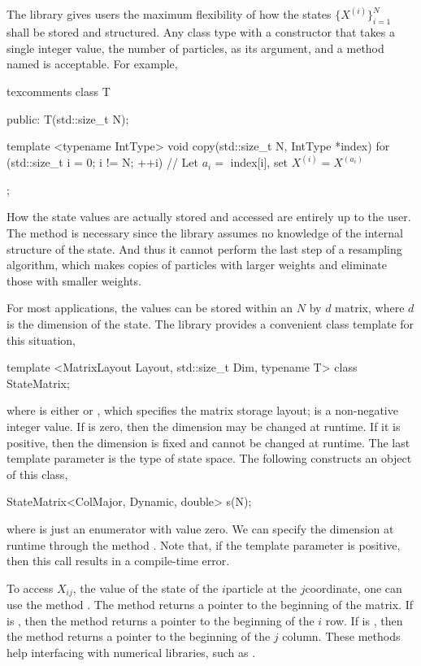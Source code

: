 The library gives users the maximum flexibility of how the states
$\{X^{(i)}\}_{i=1}^N$ shall be stored and structured. Any class type with a
constructor that takes a single integer value, the number of particles, as its
argument, and a method named  is acceptable. For example,
\begin{cppcode*}{texcomments}
  class T
  {
      public:
      T(std::size_t N);

      template <typename IntType>
      void copy(std::size_t N, IntType *index)
      {
          for (std::size_t i = 0; i != N; ++i) {
              // Let $a_i =$ index[i], set $X^{(i)} = X^{(a_i)}$
          }
      }
  };
\end{cppcode*}
How the state values are actually stored and accessed are entirely up to the
user. The method  is necessary since the library assumes no
knowledge of the internal structure of the state. And thus it cannot perform
the last step of a resampling algorithm, which makes copies of particles with
larger weights and eliminate those with smaller weights.

For most applications, the values can be stored within an $N$ by $d$ matrix,
where $d$ is the dimension of the state. The library provides a convenient
class template for this situation,
\begin{cppcode}
  template <MatrixLayout Layout, std::size_t Dim, typename T>
  class StateMatrix;
\end{cppcode}
where  is either  or
, which specifies the matrix storage layout;
 is a non-negative integer value. If  is zero,
then the dimension may be changed at runtime. If it is positive, then the
dimension is fixed and cannot be changed at runtime. The last template
parameter  is the \cpp type of state space. The following
constructs an object of this class,
\begin{cppcode}
  StateMatrix<ColMajor, Dynamic, double> s(N);
\end{cppcode}
where  is just an enumerator with value zero. We can specify
the dimension at runtime through the method . Note
that, if the template parameter  is positive, then this call
results in a compile-time error.

To access $X_{ij}$, the value of the state of the $i$\ith particle at the
$j$\ith coordinate, one can use the method . The method
 returns a pointer to the beginning of the matrix.  If
 is , then the method
 returns a pointer to the beginning of the $i$\ith
row. If  is , then the method
 returns a pointer to the beginning of the $j$\ith
column. These methods help interfacing with numerical libraries, such as \blas.

